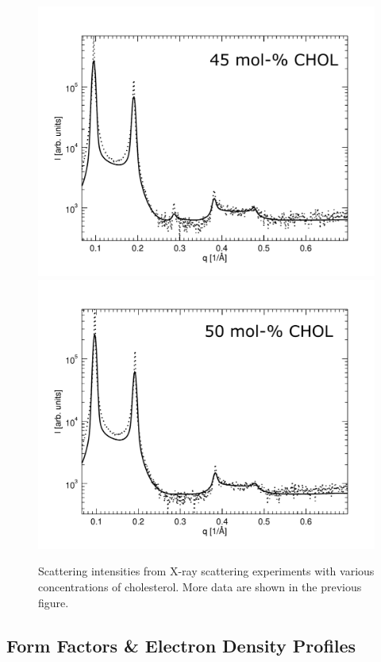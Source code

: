 \documentclass[journal=jpcbfk]{achemso}
\begin{document}
\begin{figure}[htb!]
    \includegraphics[width=0.49\linewidth]{FIGS/scatt45.pdf}\\
    \includegraphics[width=0.49\linewidth]{FIGS/scatt50.pdf}
    \caption{Scattering intensities from X-ray scattering experiments with various concentrations of cholesterol. More data are shown in the previous figure.}
    \label{SIfig:scattering2}
\end{figure}

\subsection{Form Factors \& Electron Density Profiles}
\end{document}
